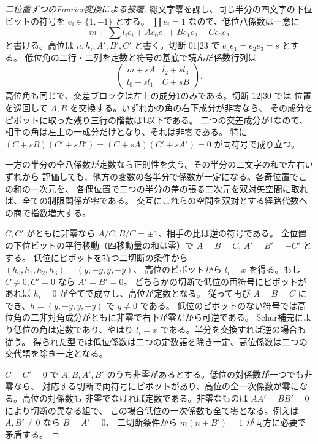 \begin{proof}[二位置ずつのFourier変換による被覆]
総文字零を課し、同じ半分の四文字の下位ビットの符号を $e_i\in\{1,-1\}$ とする。
$\prod e_i=1$ なので、低位八係数は一意に
\[
 m+\sum l_i e_i+A e_0e_1+B e_1e_2+C e_0e_2
\]
と書ける。高位は $n,h_i,A',B',C'$ と書く。切断 $01|23$ で $e_0e_1=e_2e_3=s$ とする。
低位角の二行・二列を定数と符号の基底で読んだ係数行列は
\[
 \begin{pmatrix}m+sA&l_2+s l_3\\l_0+s l_1&C+sB\end{pmatrix}.
\]
高位角も同じで、交差ブロックは左上の成分1のみである。切断 $12|30$ では
位置を巡回して $A,B$ を交換する。いずれかの角の右下成分が非零なら、
その成分をピボットに取った残り三行の階数は1以下である。
二つの交差成分が1なので、相手の角は左上の一成分だけとなり、それは非零である。
特に $(C+sB)(C'+sB')=(C+sA)(C'+sA')=0$ が両符号で成り立つ。

一方の半分の全八係数が定数なら正則性を失う。その半分の二文字の和で左右いずれから
評価しても、他方の変数の各半分で係数が一定になる。各奇位置でこの和の一次元を、
各偶位置で二つの半分の差の張る二次元を双対矢空間に取れば、全ての制限関係が零である。
交互にこれらの空間を双対とする経路代数への商で指数増大する。

$C,C'$ がともに非零なら $A/C,B/C=\pm1$、相手の比は逆の符号である。
全位置の下位ビットの平行移動（四移動量の和は零）で $A=B=C$, $A'=B'=-C'$ とする。
低位にピボットを持つ二切断の条件から $(h_0,h_1,h_2,h_3)=(y,-y,y,-y)$、
高位のピボットから $l_i=x$ を得る。もし $C\ne0,C'=0$ なら $A'=B'=0$。
どちらかの切断で低位の両符号にピボットがあれば $h_i=0$ が全てで成立し、高位が定数となる。
従って再び $A=B=C$ にでき、$h=(y,-y,y,-y)$ で $y\ne0$ である。
低位のピボットのない符号では高位角の二非対角成分がともに非零で右下が零だから可逆である。
Schur補完により低位の角は定数であり、やはり $l_i=x$ である。半分を交換すれば逆の場合も従う。
得られた型では低位係数は二つの定数語を除き一定、高位係数は二つの交代語を除き一定となる。

$C=C'=0$ で $A,B,A',B'$ のうち非零があるとする。低位の対係数が一つでも非零なら、
対応する切断で両符号にピボットがあり、高位の全一次係数が零になる。高位の対係数も
非零でなければ定数である。非零なものは $AA'=BB'=0$ により切断の異なる組で、
この場合低位の一次係数も全て零となる。例えば $A,B'\ne0$ なら $B=A'=0$、
二切断条件から $m(n\pm B')=1$ が両方に必要で矛盾する。


\end{proof}
